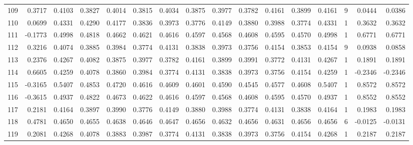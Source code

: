 \begin{tabular}{lrrrrrrrrrrrrrrr}
109 &      0.3717 &  0.4103 &  0.3827 &  0.4014 &  0.3815 &  0.4034 &  0.3875 &  0.3977 &  0.3782 &  0.4161 &   0.3899 &     0.4161 &      9 &                    0.0444 &                     0.0386 \\
110 &      0.0699 &  0.4331 &  0.4290 &  0.4177 &  0.3836 &  0.3973 &  0.3776 &  0.4149 &  0.3880 &  0.3988 &   0.3774 &     0.4331 &      1 &                    0.3632 &                     0.3632 \\
111 &     -0.1773 &  0.4998 &  0.4818 &  0.4662 &  0.4621 &  0.4616 &  0.4597 &  0.4568 &  0.4608 &  0.4595 &   0.4570 &     0.4998 &      1 &                    0.6771 &                     0.6771 \\
112 &      0.3216 &  0.4074 &  0.3885 &  0.3984 &  0.3774 &  0.4131 &  0.3838 &  0.3973 &  0.3756 &  0.4154 &   0.3853 &     0.4154 &      9 &                    0.0938 &                     0.0858 \\
113 &      0.2376 &  0.4267 &  0.4082 &  0.3875 &  0.3977 &  0.3782 &  0.4161 &  0.3899 &  0.3991 &  0.3772 &   0.4131 &     0.4267 &      1 &                    0.1891 &                     0.1891 \\
114 &      0.6605 &  0.4259 &  0.4078 &  0.3860 &  0.3984 &  0.3774 &  0.4131 &  0.3838 &  0.3973 &  0.3756 &   0.4154 &     0.4259 &      1 &                   -0.2346 &                    -0.2346 \\
115 &     -0.3165 &  0.5407 &  0.4853 &  0.4720 &  0.4616 &  0.4609 &  0.4601 &  0.4590 &  0.4545 &  0.4577 &   0.4608 &     0.5407 &      1 &                    0.8572 &                     0.8572 \\
116 &     -0.3615 &  0.4937 &  0.4822 &  0.4673 &  0.4622 &  0.4616 &  0.4597 &  0.4568 &  0.4608 &  0.4595 &   0.4570 &     0.4937 &      1 &                    0.8552 &                     0.8552 \\
117 &      0.2181 &  0.4164 &  0.3897 &  0.3990 &  0.3776 &  0.4149 &  0.3880 &  0.3988 &  0.3774 &  0.4131 &   0.3838 &     0.4164 &      1 &                    0.1983 &                     0.1983 \\
118 &      0.4781 &  0.4650 &  0.4655 &  0.4638 &  0.4646 &  0.4647 &  0.4656 &  0.4632 &  0.4656 &  0.4631 &   0.4656 &     0.4656 &      6 &                   -0.0125 &                    -0.0131 \\
119 &      0.2081 &  0.4268 &  0.4078 &  0.3883 &  0.3987 &  0.3774 &  0.4131 &  0.3838 &  0.3973 &  0.3756 &   0.4154 &     0.4268 &      1 &                    0.2187 &                     0.2187 \\

\end{tabular}
